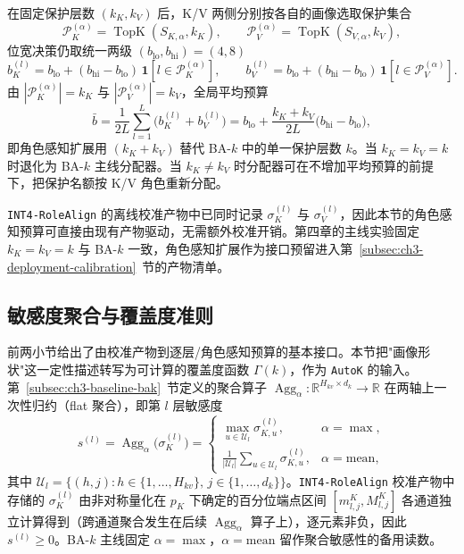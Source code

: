 在固定保护层数 $(k_K, k_V)$ 后，K/V 两侧分别按各自的画像选取保护集合
\begin{equation}
\mathcal P_K^{(\alpha)}
=
\operatorname{TopK}(S_{K,\alpha},k_K),
\qquad
\mathcal P_V^{(\alpha)}
=
\operatorname{TopK}(S_{V,\alpha},k_V),
\end{equation}
位宽决策仍取统一两级 $(b_\mathrm{lo}, b_\mathrm{hi})=(4,8)$
\begin{equation}
b_K^{(l)}
=
b_\mathrm{lo}+(b_\mathrm{hi}-b_\mathrm{lo})\,\mathbf 1\!\left[l\in\mathcal P_K^{(\alpha)}\right],
\qquad
b_V^{(l)}
=
b_\mathrm{lo}+(b_\mathrm{hi}-b_\mathrm{lo})\,\mathbf 1\!\left[l\in\mathcal P_V^{(\alpha)}\right].
\end{equation}
由 $|\mathcal P_K^{(\alpha)}|=k_K$ 与 $|\mathcal P_V^{(\alpha)}|=k_V$，全局平均预算
\begin{equation}
\bar b
=
\frac{1}{2L}\sum_{l=1}^{L}\bigl(b_K^{(l)}+b_V^{(l)}\bigr)
=
b_\mathrm{lo}+\frac{k_K+k_V}{2L}\bigl(b_\mathrm{hi}-b_\mathrm{lo}\bigr),
\end{equation}
即角色感知扩展用 $(k_K+k_V)$ 替代 BA-$k$ 中的单一保护层数 $k$。当 $k_K=k_V=k$ 时退化为 BA-$k$ 主线分配器。当 $k_K\neq k_V$ 时分配器可在不增加平均预算的前提下，把保护名额按 K/V 角色重新分配。

\texttt{INT4-RoleAlign} 的离线校准产物中已同时记录 $\sigma_K^{(l)}$ 与 $\sigma_V^{(l)}$，因此本节的角色感知预算可直接由现有产物驱动，无需额外校准开销。第四章的主线实验固定 $k_K=k_V=k$ 与 BA-$k$ 一致，角色感知扩展作为接口预留进入第~\ref{subsec:ch3-deployment-calibration}~节的产物清单。

\subsection{敏感度聚合与覆盖度准则}
\label{subsec:ch3-aggregation-robust}

前两小节给出了由校准产物到逐层/角色感知预算的基本接口。本节把"画像形状"这一定性描述转写为可计算的覆盖度函数 $\Gamma(k)$，作为 \texttt{AutoK} 的输入。第~\ref{subsec:ch3-baseline-bak}~节定义的聚合算子 $\operatorname{Agg}_\alpha:\mathbb{R}^{H_{kv}\times d_k}\to\mathbb{R}$ 在两轴上一次性归约（flat 聚合），即第 $l$ 层敏感度
\begin{equation}
s^{(l)}
=
\operatorname{Agg}_\alpha\!\bigl(\sigma_K^{(l)}\bigr)
=
\begin{cases}
\displaystyle \max_{u\in\mathcal U_l}\sigma^{(l)}_{K,u}, & \alpha=\max,\\[6pt]
\displaystyle \frac{1}{|\mathcal U_l|}\sum_{u\in\mathcal U_l}\sigma^{(l)}_{K,u}, & \alpha=\mathrm{mean},
\end{cases}
\end{equation}
其中 $\mathcal U_l=\{(h,j):h\in\{1,\dots,H_{kv}\},\,j\in\{1,\dots,d_k\}\}$。\texttt{INT4-RoleAlign} 校准产物中存储的 $\sigma_K^{(l)}$ 由非对称量化在 $p_K$ 下确定的百分位端点区间 $[m^K_{l,j}, M^K_{l,j}]$ 各通道独立计算得到（跨通道聚合发生在后续 $\operatorname{Agg}_\alpha$ 算子上），逐元素非负，因此 $s^{(l)}\ge 0$。BA-$k$ 主线固定 $\alpha=\max$，$\alpha=\mathrm{mean}$ 留作聚合敏感性的备用读数。


